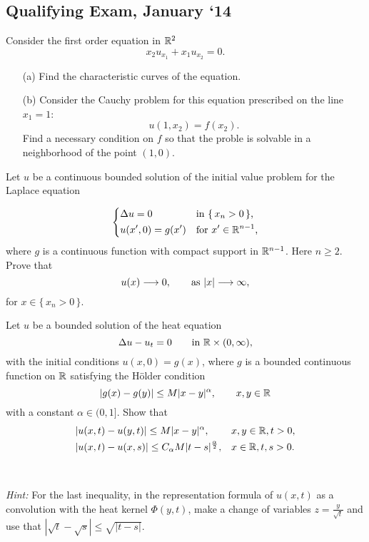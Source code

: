 \subsection{Qualifying Exam, January `14}
\begin{problem}
  Consider the first order equation in \(\mathbb{R}^2\)
  \[
    x_2u_{x_1}+x_1u_{x_2}=0.
  \]
  \begin{itemize}[noitemsep]
  \item[(a)] Find the characteristic curves of the equation.
  \item[(b)] Consider the Cauchy problem for this equation prescribed on
    the line \(x_1=1\):
    \[
      u(1,x_2)=f(x_2).
    \]
    Find a necessary condition on \(f\) so that the proble is solvable in a
    neighborhood of the point \((1,0)\).
  \end{itemize}
\end{problem}
\begin{solution*}
\end{solution*}

\begin{problem}
  Let \(u\) be a continuous bounded solution of the initial value problem
  for the Laplace equation

  \[
    \left\{
      \begin{aligned}
        &\Delta u=0&&\text{in \(\{\,x_n>0\,\}\),}\\
        &u(x',0)=g(x')&&\text{for \(x'\in\mathbb{R}^{n-1}\),}
      \end{aligned}
    \right.
  \]
  where \(g\) is a continuous function with compact support in
  \(\mathbb{R}^{n-1}\). Here \(n\geq 2\). Prove that
  \[
    u(x)\To 0,\qquad%
    \text{as } |x|\To \infty,
  \]
  for \(x\in\{\,x_n>0\,\}\).
\end{problem}
\begin{solution*}
\end{solution*}

\begin{problem}
  Let \(u\) be a bounded solution of the heat equation
  \[
    \Delta u-u_t=0\qquad\text{in \(\mathbb{R}\times(0,\infty)\),}
  \]
  with the initial conditions \(u(x,0)=g(x)\), where \(g\) is a bounded
  continuous function on \(\mathbb{R}\) satisfying the Hölder condition
  \[
    |g(x)-g(y)|\leq M|x-y|^\alpha,\qquad x,y\in\mathbb{R}
  \]
  with a constant \(\alpha\in (0, 1]\). Show that
  \[
    \begin{aligned}
      &|u(x,t)-u(y,t)|\leq M|x-y|^\alpha,&&x,y\in\mathbb{R},t>0,\\
      &|u(x,t)-u(x,s)|\leq C_\alpha M|t-s|^{\frac{\alpha}{2}},&&x\in\mathbb{R},t,s>0.
    \end{aligned}
  \]
  \\\\
  \emph{Hint:} For the last inequality, in the representation formula of
  \(u(x,t)\) as a convolution with the heat kernel \(\Phi(y,t)\), make a
  change of variables \(z=\frac{y}{\sqrt{t}}\) and use that
  $\left|\sqrt{t}-\sqrt{s}\right|\leq\sqrt{|t-s|}$.
\end{problem}
\begin{solution*}
\end{solution*}


